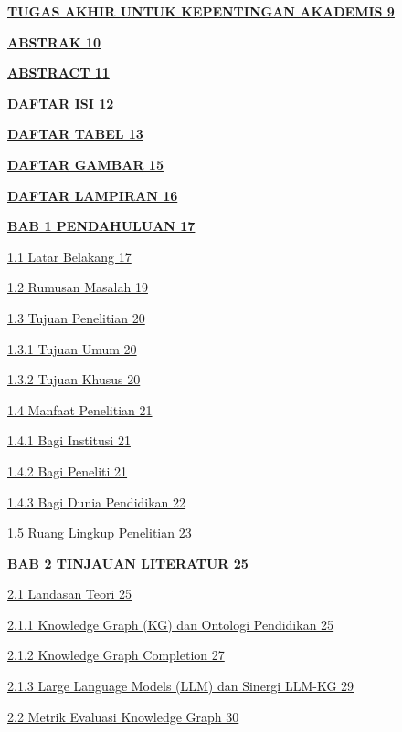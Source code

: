 \documentclass[
]{article}
\begin{document}
\protect\hyperlink{tugas-akhir-untuk-kepentingan-akademis}{\textbf{TUGAS
AKHIR UNTUK KEPENTINGAN AKADEMIS 9}}

\protect\hyperlink{abstrak}{\textbf{ABSTRAK 10}}

\protect\hyperlink{abstract}{\textbf{ABSTRACT 11}}

\protect\hyperlink{daftar-isi}{\textbf{DAFTAR ISI 12}}

\protect\hyperlink{daftar-tabel}{\textbf{DAFTAR TABEL 13}}

\protect\hyperlink{daftar-gambar}{\textbf{DAFTAR GAMBAR 15}}

\protect\hyperlink{daftar-lampiran}{\textbf{DAFTAR LAMPIRAN 16}}

\protect\hyperlink{pendahuluan}{\textbf{BAB 1 PENDAHULUAN 17}}

\protect\hyperlink{latar-belakang}{1.1 Latar Belakang 17}

\protect\hyperlink{rumusan-masalah}{1.2 Rumusan Masalah 19}

\protect\hyperlink{tujuan-penelitian}{1.3 Tujuan Penelitian 20}

\protect\hyperlink{tujuan-umum}{1.3.1 Tujuan Umum 20}

\protect\hyperlink{tujuan-khusus}{1.3.2 Tujuan Khusus 20}

\protect\hyperlink{manfaat-penelitian}{1.4 Manfaat Penelitian 21}

\protect\hyperlink{bagi-institusi}{1.4.1 Bagi Institusi 21}

\protect\hyperlink{bagi-peneliti}{1.4.2 Bagi Peneliti 21}

\protect\hyperlink{bagi-dunia-pendidikan}{1.4.3 Bagi Dunia Pendidikan
22}

\protect\hyperlink{ruang-lingkup-penelitian}{1.5 Ruang Lingkup
Penelitian 23}

\protect\hyperlink{tinjauan-literatur}{\textbf{BAB 2 TINJAUAN LITERATUR
25}}

\protect\hyperlink{landasan-teori}{2.1 Landasan Teori 25}

\protect\hyperlink{knowledge-graph-kg-dan-ontologi-pendidikan}{2.1.1
Knowledge Graph (KG) dan Ontologi Pendidikan 25}

\protect\hyperlink{knowledge-graph-completion}{2.1.2 Knowledge Graph
Completion 27}

\protect\hyperlink{large-language-models-llm-dan-sinergi-llm-kg}{2.1.3
Large Language Models (LLM) dan Sinergi LLM-KG 29}

\protect\hyperlink{metrik-evaluasi-knowledge-graph}{2.2 Metrik Evaluasi
Knowledge Graph 30}
\end{document}
